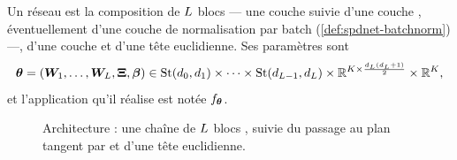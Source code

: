 \begin{definition}
\label{def:spdnet-architecture}
  Un réseau \SPDnet{} est la composition de $L$ blocs \BiRe{}
  --- une couche \BiMap{} suivie d'une couche \ReEig{}, éventuellement d'une
  couche de normalisation par batch (\cref{def:spdnet-batchnorm}) ---, d'une
  couche \LogEig{} et d'une tête euclidienne. Ses paramètres sont
  \begin{equation}
    \boldsymbol{\theta}
    =
    \left(\boldsymbol{W}_1,\dots,\boldsymbol{W}_{L},\boldsymbol{\Xi},\boldsymbol{\beta}\right)
    \in
    \mathrm{St}(d_{0},d_{1})\times\cdots\times
    \mathrm{St}(d_{L-1},d_{L})\times\mathbb{R}^{K\times\frac{d_{L}(d_{L}+1)}{2}}\times\mathbb{R}^{K},
    \label{eq:spdnet-parametres}
  \end{equation}
  et l'application qu'il réalise est notée $f_{\boldsymbol{\theta}}$.
\end{definition}

\begin{figure}[htb]
  \begin{center}
    \makebox[\textwidth][c]{}
  \end{center}
  \caption{Architecture \SPDnet{} : une chaîne
    de $L$ blocs \BiRe, suivie du passage au plan tangent par \LogEig{} et
    d'une tête euclidienne. %
  }
  \label{fig:spdnet-architecture}
\end{figure}


